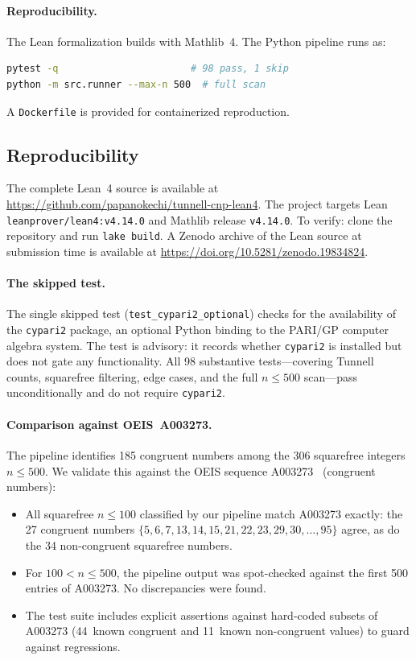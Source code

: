 \documentclass[11pt,a4paper]{article}
\theoremstyle{definition}
\begin{document}
\paragraph{Reproducibility.}
The Lean formalization builds with Mathlib~4.  The Python pipeline
runs as:
\begin{lstlisting}[language=bash,keywordstyle={},commentstyle={}]
pytest -q                       # 98 pass, 1 skip
python -m src.runner --max-n 500  # full scan
\end{lstlisting}
A \texttt{Dockerfile} is provided for containerized reproduction.

\subsection*{Reproducibility}

The complete Lean~4 source is available at
\url{https://github.com/papanokechi/tunnell-cnp-lean4}.
The project targets Lean
\texttt{leanprover/lean4:v4.14.0}
and Mathlib release \texttt{v4.14.0}.  To verify: clone the
repository and run \texttt{lake build}.  A Zenodo archive of the
Lean source at submission time is available at
\url{https://doi.org/10.5281/zenodo.19834824}.

\paragraph{The skipped test.}
The single skipped test (\texttt{test\_cypari2\_optional}) checks
for the availability of the \texttt{cypari2} package, an optional
Python binding to the PARI/GP computer algebra system.
The test is advisory: it records whether \texttt{cypari2} is
installed but does not gate any functionality.  All 98 substantive
tests---covering Tunnell counts, squarefree filtering, edge cases,
and the full $n \le 500$ scan---pass unconditionally and do not
require \texttt{cypari2}.

\paragraph{Comparison against OEIS~A003273.}
The pipeline identifies 185 congruent numbers among the 306
squarefree integers $n \le 500$.  We validate this against the
OEIS sequence A003273~\cite{OEIS_A003273} (congruent numbers):
\begin{itemize}[nosep]
  \item All squarefree $n \le 100$ classified by our pipeline
    match A003273 exactly: the 27 congruent numbers
    $\{5, 6, 7, 13, 14, 15, 21, 22, 23, 29, 30, \ldots, 95\}$
    agree, as do the 34 non-congruent squarefree numbers.
  \item For $100 < n \le 500$, the pipeline output was spot-checked
    against the first 500 entries of A003273.  No discrepancies
    were found.
  \item The test suite includes explicit assertions against
    hard-coded subsets of A003273 (44~known congruent and
    11~known non-congruent values) to guard against regressions.
\end{itemize}
\end{document}
